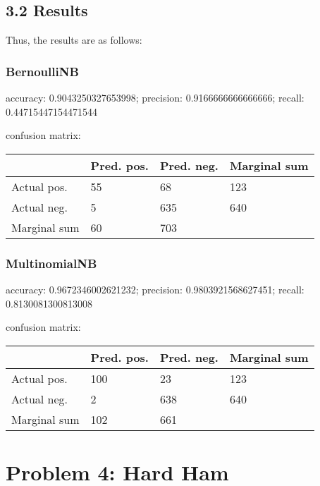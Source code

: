 \documentclass[11pt]{article}
\begin{document}
    \hypertarget{results}{%
\subsection{3.2 Results}\label{results}}

Thus, the results are as follows:

\hypertarget{bernoullinb}{%
\subsubsection{BernoulliNB}\label{bernoullinb}}

accuracy: 0.9043250327653998; precision: 0.9166666666666666; recall:
0.44715447154471544

confusion matrix:

\begin{longtable}[]{@{}llll@{}}
\toprule\noalign{}
& Pred. pos. & Pred. neg. & Marginal sum \\
\midrule\noalign{}
\endhead
\bottomrule\noalign{}
\endlastfoot
Actual pos. & 55 & 68 & 123 \\
Actual neg. & 5 & 635 & 640 \\
Marginal sum & 60 & 703 & \\
\end{longtable}

\hypertarget{multinomialnb}{%
\subsubsection{MultinomialNB}\label{multinomialnb}}

accuracy: 0.9672346002621232; precision: 0.9803921568627451; recall:
0.8130081300813008

confusion matrix:

\begin{longtable}[]{@{}llll@{}}
\toprule\noalign{}
& Pred. pos. & Pred. neg. & Marginal sum \\
\midrule\noalign{}
\endhead
\bottomrule\noalign{}
\endlastfoot
Actual pos. & 100 & 23 & 123 \\
Actual neg. & 2 & 638 & 640 \\
Marginal sum & 102 & 661 & \\
\end{longtable}

    \hypertarget{problem-4-hard-ham}{%
\section{Problem 4: Hard Ham}\label{problem-4-hard-ham}}
\end{document}
